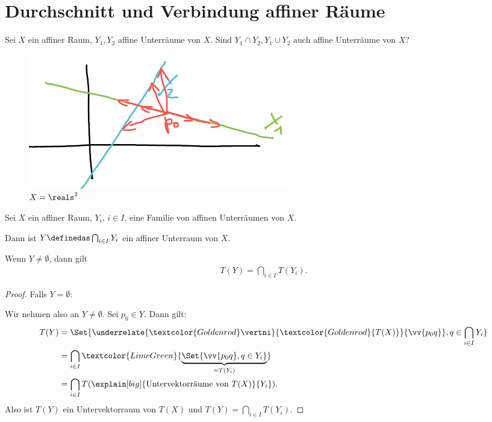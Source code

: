 \section{Durchschnitt und Verbindung affiner Räume}
\begin{frage*}
    Sei \( X \) ein affiner Raum, \(    Y_1, Y_2 \) affine Unterräume von \( X \). Sind \( Y_1\cap Y_2, Y_1\cup Y_2 \) auch affine Unterräume von \( X \)?
    \begin{figure}[H]
        \centering
        \includegraphics[width=0.5\linewidth]{figures/verbindung_affine_raeume}
        \caption*{\( X=\reals^2 \)}
        \label{fig:verbindung_affine_raeume}
    \end{figure}
\end{frage*}
\begin{lemma}\label{schnittraum:translationen}
    Sei \( X \) ein affiner Raum, \( Y_i \), \( i\in I \), eine Familie von affinen Unterräumen von \( X \).

    Dann ist \( Y\definedas \bigcap_{i\in I} Y_i \) ein affiner Unterraum von \( X \).

    Wenn \( Y\neq \emptyset \), dann gilt
    \begin{align*}
        T(Y)=\bigcap_{i\in I}T(Y_i).
    \end{align*}
\end{lemma}
\begin{proof}
    Falls \( Y=\emptyset \): \checkmark

    Wir nehmen also an \( Y\neq \emptyset \).
    Sei \( p_0\in Y \).
    Dann gilt:
    \begin{align*}
        T(Y)\begin{aligned}[t] 
            &=\Set{\underrelate{\textcolor{Goldenrod}\vertni}{\textcolor{Goldenrod}{T(X)}}{\vv{p_0 q}},q\in \bigcap_{i\in I}Y_i}\\
            &=\bigcap_{i\in I}\textcolor{LimeGreen}{\underbrace{\Set{\vv{p_0 q}, q\in Y_i}}_{=T(Y_i)}}\\
            &=\bigcap_{i\in I}T(\explain[big]{\text{Untervektorräume von \( T(X) \)}}{Y_i}).
        \end{aligned}
    \end{align*}
    Also ist \( T(Y) \) ein Untervektorraum von \( T(X) \) und \( T(Y)=\bigcap_{i\in I}T(Y_i) \).
\end{proof}
